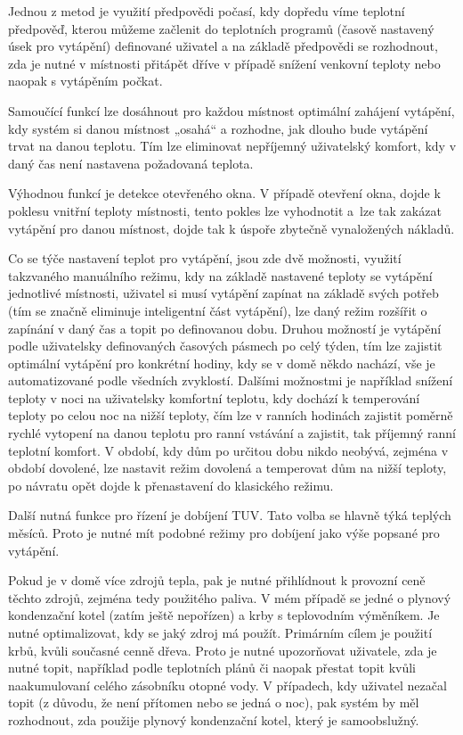 Jednou z metod je využití předpovědi počasí, kdy dopředu víme teplotní předpověď, kterou můžeme začlenit do teplotních programů (časově nastavený úsek pro vytápění) definované uživatel a na základě  předpovědi se rozhodnout, zda je nutné v místnosti přitápět dříve v případě snížení venkovní teploty nebo naopak s vytápěním počkat. 

Samoučící funkcí lze dosáhnout pro každou místnost optimální zahájení vytápění, kdy systém si danou místnost „osahá“ a rozhodne, jak dlouho bude vytápění trvat na danou teplotu. Tím lze eliminovat nepříjemný uživatelský komfort, kdy v daný čas není nastavena požadovaná teplota.

Výhodnou funkcí je detekce otevřeného okna. V případě otevření okna, dojde k poklesu vnitřní teploty místnosti, tento pokles lze vyhodnotit a~lze tak zakázat vytápění pro danou místnost, dojde  tak k úspoře zbytečně vynaložených nákladů.

Co se týče nastavení teplot pro vytápění, jsou zde dvě možnosti, využití takzvaného manuálního režimu, kdy na základě nastavené teploty se vytápění jednotlivé místnosti, uživatel si musí vytápění zapínat na základě svých potřeb (tím se značně eliminuje inteligentní část vytápění), lze daný režim rozšířit o zapínání  v daný čas a topit po definovanou dobu. Druhou možností je vytápění podle uživatelsky definovaných časových pásmech po celý týden, tím lze zajistit optimální vytápění pro konkrétní hodiny, kdy se v domě někdo nachází, vše je automatizované podle všedních zvyklostí. Dalšími možnostmi je například snížení teploty v noci na uživatelsky komfortní teplotu, kdy dochází k temperování teploty po celou noc na nižší teploty, čím lze v ranních hodinách  zajistit poměrně rychlé vytopení na danou teplotu pro ranní vstávání a zajistit, tak příjemný ranní teplotní komfort. V období, kdy dům po určitou dobu nikdo neobývá, zejména v období dovolené, lze nastavit režim dovolená a temperovat dům na nižší teploty, po návratu opět dojde k přenastavení do klasického režimu. 

Další nutná funkce pro řízení je dobíjení TUV. Tato volba se hlavně týká teplých měsíců. Proto je nutné mít podobné režimy pro dobíjení jako výše popsané pro vytápění.

Pokud je v domě více zdrojů tepla, pak je nutné přihlídnout k provozní ceně těchto zdrojů, zejména tedy použitého paliva. V mém případě se jedné o plynový kondenzační kotel (zatím ještě nepořízen) a krby s teplovodním výměníkem. Je nutné optimalizovat, kdy se jaký zdroj má použít. Primárním cílem je použití krbů, kvůli současné cenně dřeva. Proto je nutné upozorňovat uživatele, zda je nutné topit, například podle teplotních plánů či naopak přestat topit kvůli naakumulovaní celého zásobníku otopné vody. V případech, kdy uživatel nezačal topit (z důvodu, že není přítomen nebo se jedná o noc), pak systém by měl rozhodnout, zda použije plynový kondenzační kotel, který je samoobslužný.

